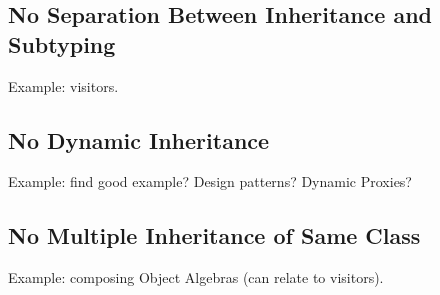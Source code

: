 \subsection{No Separation Between Inheritance and Subtyping}

Example: visitors. 

\subsection{No Dynamic Inheritance}

Example: find good example? Design patterns? Dynamic Proxies?

\subsection{No Multiple Inheritance of Same Class}

Example: composing Object Algebras (can relate to visitors).